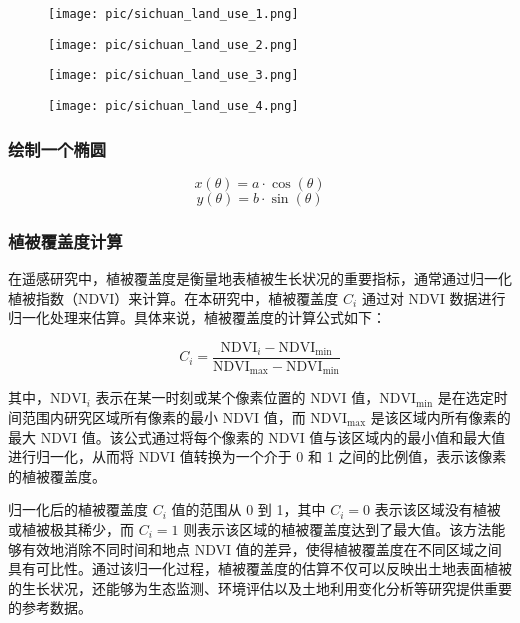 \documentclass{article}
\begin{document}
		
		
		\begin{figure}[H]  %
			\centering
			\texttt{[image: pic/sichuan\_land\_use\_1.png]} %
		\end{figure}
		\begin{figure}[H]  %
			\centering
			\texttt{[image: pic/sichuan\_land\_use\_2.png]} %
		\end{figure}
		\begin{figure}[H]  %
			\centering
			\texttt{[image: pic/sichuan\_land\_use\_3.png]} %
		\end{figure}
		\begin{figure}[H]  %
			\centering
			\texttt{[image: pic/sichuan\_land\_use\_4.png]} %
		\end{figure}
		
		
		\subsubsection{绘制一个椭圆}
		
		\[
		x(\theta) = a \cdot \cos(\theta)
		\]
		\[
		y(\theta) = b \cdot \sin(\theta)
		\]
		\subsubsection{植被覆盖度计算}
		
		
		在遥感研究中，植被覆盖度是衡量地表植被生长状况的重要指标，通常通过归一化植被指数（NDVI）来计算。在本研究中，植被覆盖度 \( C_i \) 通过对 NDVI 数据进行归一化处理来估算。具体来说，植被覆盖度的计算公式如下：
		
		\[
		C_i = \frac{\text{NDVI}_{i} - \text{NDVI}_{\text{min}}}{\text{NDVI}_{\text{max}} - \text{NDVI}_{\text{min}}}
		\]
		
		其中，\( \text{NDVI}_{i} \) 表示在某一时刻或某个像素位置的 NDVI 值，\( \text{NDVI}_{\text{min}} \) 是在选定时间范围内研究区域所有像素的最小 NDVI 值，而 \( \text{NDVI}_{\text{max}} \) 是该区域内所有像素的最大 NDVI 值。该公式通过将每个像素的 NDVI 值与该区域内的最小值和最大值进行归一化，从而将 NDVI 值转换为一个介于 0 和 1 之间的比例值，表示该像素的植被覆盖度。
		
		归一化后的植被覆盖度 \( C_i \) 值的范围从 0 到 1，其中 \( C_i = 0 \) 表示该区域没有植被或植被极其稀少，而 \( C_i = 1 \) 则表示该区域的植被覆盖度达到了最大值。该方法能够有效地消除不同时间和地点 NDVI 值的差异，使得植被覆盖度在不同区域之间具有可比性。通过该归一化过程，植被覆盖度的估算不仅可以反映出土地表面植被的生长状况，还能够为生态监测、环境评估以及土地利用变化分析等研究提供重要的参考数据。
		
\end{document}
